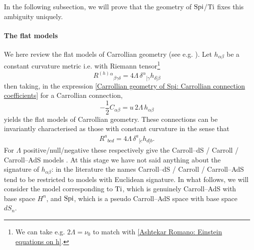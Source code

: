 \documentclass[a4paper, 10pt]{article}
\theoremstyle{remark}
\newcommand{\Ti}{\textnormal{Ti}}
\newcommand{\Spi}{\textnormal{Spi}}
\begin{document}
In the following subsection, we will prove that the geometry of $\Spi$/$\Ti$ fixes this ambiguity uniquely. 


\paragraph{The flat models}\mbox{} 

We here review the flat models of Carrollian geometry (see e.g. \cite{Herfray:2021qmp}). Let $h_{\alpha\beta}$ be a constant curvature metric i.e. with Riemann tensor\footnote{We can take e.g. $2 \Lambda = \nu_0$ to match with \eqref{Ashtekar Romano: Einstein equations on h}.}
\begin{equation}\label{Base curvature: flat model}
    R^{(h)}{}^{\alpha}{}_{\beta \gamma \delta} = 4\Lambda \, \delta^{\alpha}{}_{[\gamma}h_{\delta]\beta}
\end{equation}
then taking, in the expression \eqref{Carrollian geometry of Spi: Carrollian connection coefficients} for a Carrollian connection,
    \begin{equation}\label{Carrollian connection: flat model}
        -\frac{1}{2}C_{\alpha\beta} = u \,2\Lambda\,h_{\alpha \beta}
    \end{equation}
yields the flat models of Carrollian geometry. These connections can be invariantly characterised as those with constant curvature in the sense that 
\begin{align}\label{Carrollian curvature: flat model}
R^{a}{}_{bcd}=4\Lambda \, \delta^{a}{}_{[c}h_{d]b}.
\end{align}
For $\Lambda$ positive/null/negative these respectively give the Carroll--dS / Carroll / Carroll--AdS models \cite{bacry_possible_1968,figueroa-ofarrill_spatially_2019}. At this stage we have not said anything about the signature of $h_{\alpha\beta}$: in the literature the names Carroll--dS / Carroll / Carroll--AdS tend to be restricted to models with Euclidean signature. In what follows, we will consider the model corresponding to $\Ti$, which is genuinely Carroll--AdS with base space $H^n$, and $\Spi$, which is a pseudo Carroll--AdS space with base space $dS_n$.
\end{document}
